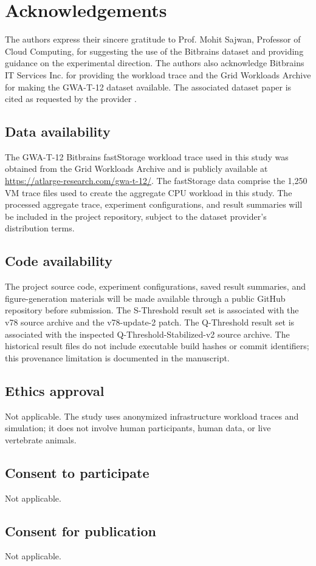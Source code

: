 \documentclass[pdflatex,sn-mathphys-num]{sn-jnl}
\begin{document}
\section*{Acknowledgements}
The authors express their sincere gratitude to Prof. Mohit Sajwan, Professor of Cloud Computing, for suggesting the use of the Bitbrains dataset and providing guidance on the experimental direction. The authors also acknowledge Bitbrains IT Services Inc. for providing the workload trace and the Grid Workloads Archive for making the GWA-T-12 dataset available. The associated dataset paper is cited as requested by the provider \cite{shen2015bitbrains}.

\subsection*{Data availability}
The GWA-T-12 Bitbrains fastStorage workload trace used in this study was obtained from the Grid Workloads Archive and is publicly available at \url{https://atlarge-research.com/gwa-t-12/}. The fastStorage data comprise the 1,250 VM trace files used to create the aggregate CPU workload in this study. The processed aggregate trace, experiment configurations, and result summaries will be included in the project repository, subject to the dataset provider's distribution terms.

\subsection*{Code availability}
The project source code, experiment configurations, saved result summaries, and figure-generation materials will be made available through a public GitHub repository before submission. The S-Threshold result set is associated with the v78 source archive and the v78-update-2 patch. The Q-Threshold result set is associated with the inspected Q-Threshold-Stabilized-v2 source archive. The historical result files do not include executable build hashes or commit identifiers; this provenance limitation is documented in the manuscript.

\subsection*{Ethics approval}
Not applicable. The study uses anonymized infrastructure workload traces and simulation; it does not involve human participants, human data, or live vertebrate animals.

\subsection*{Consent to participate}
Not applicable.

\subsection*{Consent for publication}
Not applicable.


\end{document}
